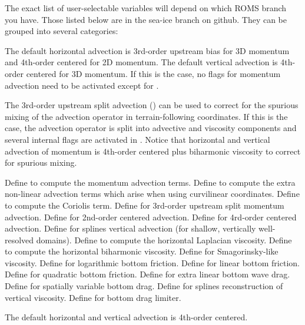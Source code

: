 The exact list of user-selectable  variables will depend
on which ROMS branch you have. Those listed below are in the sea-ice
branch on github. They can be grouped into several categories:
\begin{klist}
    \mbox{}
The default horizontal advection is 3rd-order upstream bias for
3D momentum and 4th-order centered for 2D momentum. The default
vertical advection is 4th-order centered for 3D momentum. If this
is the case, no flags for momentum advection need to be activated except
for .

The 3rd-order upstream split advection () can be used
to correct for the spurious mixing of the advection operator in
terrain-following coordinates. If this is the case, the advection
operator is split into advective and viscosity components and several
internal flags are activated in .  Notice that
horizontal and vertical advection of momentum is 4th-order centered
plus biharmonic viscosity to correct for spurious mixing.
  \begin{klist}
         Define to compute the momentum advection terms.
        Define to compute the extra
  non-linear advection terms which arise when using curvilinear coordinates.
         Define to compute the Coriolis term.
     Define for 3rd-order upstream split
  momentum advection.
     Define for 2nd-order centered advection.
     Define for 4rd-order centered advection.
     Define for splines vertical advection
    (for shallow, vertically well-resolved domains).
        Define to compute the
  horizontal Laplacian viscosity.
        Define to compute the
  horizontal biharmonic viscosity.
     Define for Smagorinsky-like viscosity.
     Define for logarithmic bottom friction.
       Define for linear bottom friction.
       Define for quadratic bottom friction.
     Define for extra linear bottom wave drag.
      Define for spatially variable bottom drag.
      Define for splines reconstruction of
  vertical viscosity.
      Define for bottom drag limiter.
  \end{klist}
   \mbox{}
The default horizontal and vertical advection is 4th-order centered.


\end{klist}
